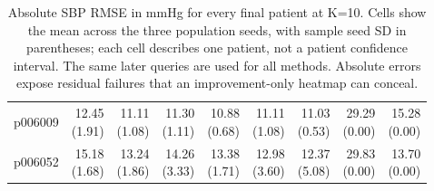 \documentclass[11pt]{article}
\begin{document}
\begin{table}[!htbp]
\begin{tabular}{lrrrrrrrr}
p006009 & \shortstack{12.45\\(1.91)} & \shortstack{11.11\\(1.08)} & \shortstack{11.30\\(1.11)} & \shortstack{10.88\\(0.68)} & \shortstack{11.11\\(1.08)} & \shortstack{11.03\\(0.53)} & \shortstack{29.29\\(0.00)} & \shortstack{15.28\\(0.00)}\\
p006052 & \shortstack{15.18\\(1.68)} & \shortstack{13.24\\(1.86)} & \shortstack{14.26\\(3.33)} & \shortstack{13.38\\(1.71)} & \shortstack{12.98\\(3.60)} & \shortstack{12.37\\(5.08)} & \shortstack{29.83\\(0.00)} & \shortstack{13.70\\(0.00)}\\
\bottomrule\end{tabular}
\caption{Absolute SBP RMSE in mmHg for every final patient at K=10. Cells show the mean across the three population seeds, with sample seed SD in parentheses; each cell describes one patient, not a patient confidence interval. The same later queries are used for all methods. Absolute errors expose residual failures that an improvement-only heatmap can conceal.}\end{table}
\end{document}

